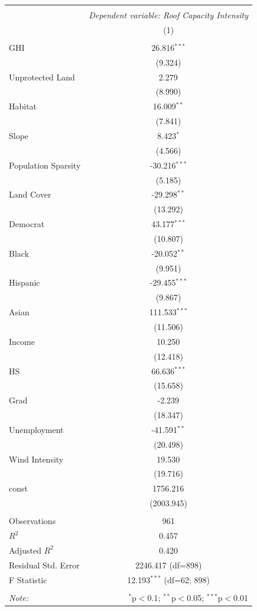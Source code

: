 \begin{table}[!htbp] \centering
\begin{tabular}{@{\extracolsep{5pt}}lc}
\\[-1.8ex]\hline
\hline \\[-1.8ex]
& \multicolumn{1}{c}{\textit{Dependent variable: Roof Capacity Intensity}} \
\cr \cline{2-2}
\\[-1.8ex] & (1) \\
\hline \\[-1.8ex]
 GHI & 26.816$^{***}$ \\
& (9.324) \\
 Unprotected Land & 2.279$^{}$ \\
& (8.990) \\
 Habitat & 16.009$^{**}$ \\
& (7.841) \\
 Slope & 8.423$^{*}$ \\
& (4.566) \\
 Population Sparsity & -30.216$^{***}$ \\
& (5.185) \\
 Land Cover & -29.298$^{**}$ \\
& (13.292) \\
 Democrat & 43.177$^{***}$ \\
& (10.807) \\
 Black & -20.052$^{**}$ \\
& (9.951) \\
 Hispanic & -29.455$^{***}$ \\
& (9.867) \\
 Asian & 111.533$^{***}$ \\
& (11.506) \\
 Income & 10.250$^{}$ \\
& (12.418) \\
 HS & 66.636$^{***}$ \\
& (15.658) \\
 Grad & -2.239$^{}$ \\
& (18.347) \\
 Unemployment & -41.591$^{**}$ \\
& (20.498) \\
 Wind Intensity & 19.530$^{}$ \\
& (19.716) \\
 const & 1756.216$^{}$ \\
& (2003.945) \\
\hline \\[-1.8ex]
 Observations & 961 \\
 $R^2$ & 0.457 \\
 Adjusted $R^2$ & 0.420 \\
 Residual Std. Error & 2246.417 (df=898) \\
 F Statistic & 12.193$^{***}$ (df=62; 898) \\
\hline
\hline \\[-1.8ex]
\textit{Note:} & \multicolumn{1}{r}{$^{*}$p$<$0.1; $^{**}$p$<$0.05; $^{***}$p$<$0.01} \\
\end{tabular}
\end{table}